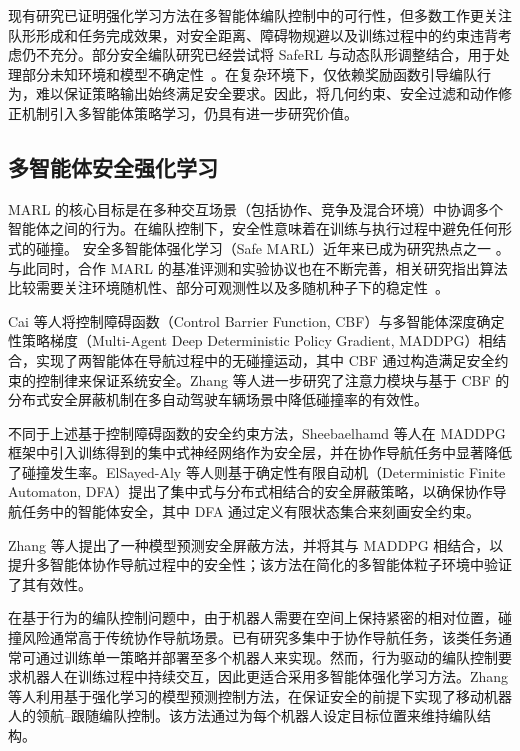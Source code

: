 现有研究已证明强化学习方法在多智能体编队控制中的可行性，但多数工作更关注队形形成和任务完成效果，对安全距离、障碍物规避以及训练过程中的约束违背考虑仍不充分。部分安全编队研究已经尝试将 SafeRL 与动态队形调整结合，用于处理部分未知环境和模型不确定性~\cite{golmisheh2023distributed_safe_formation}。在复杂环境下，仅依赖奖励函数引导编队行为，难以保证策略输出始终满足安全要求。因此，将几何约束、安全过滤和动作修正机制引入多智能体策略学习，仍具有进一步研究价值。

\subsection{多智能体安全强化学习}
MARL 的核心目标是在多种交互场景（包括协作、竞争及混合环境）中协调多个智能体之间的行为。在编队控制下，安全性意味着在训练与执行过程中避免任何形式的碰撞。
安全多智能体强化学习（Safe MARL）近年来已成为研究热点之一 \cite{gu2023safe,garg2024learning,li2025coordinating}。与此同时，合作 MARL 的基准评测和实验协议也在不断完善，相关研究指出算法比较需要关注环境随机性、部分可观测性以及多随机种子下的稳定性~\cite{papoudakis2021benchmarking_marl,gorsane2022standardised_marl_eval,ellis2023smacv2}。

Cai 等人\cite{cai2021safe}将控制障碍函数（Control Barrier Function, CBF）与多智能体深度确定性策略梯度（Multi-Agent Deep Deterministic Policy Gradient, MADDPG）\cite{lowe2017multi}相结合，实现了两智能体在导航过程中的无碰撞运动，其中 CBF 通过构造满足安全约束的控制律来保证系统安全。Zhang 等人\cite{zhang2023spatial}进一步研究了注意力模块与基于 CBF 的分布式安全屏蔽机制在多自动驾驶车辆场景中降低碰撞率的有效性。

不同于上述基于控制障碍函数的安全约束方法，Sheebaelhamd 等人\cite{sheebaelhamd2021safe}在 MADDPG 框架中引入训练得到的集中式神经网络作为安全层，并在协作导航任务中显著降低了碰撞发生率。ElSayed-Aly 等人\cite{elsayed2021safe}则基于确定性有限自动机（Deterministic Finite Automaton, DFA）提出了集中式与分布式相结合的安全屏蔽策略，以确保协作导航任务中的智能体安全，其中 DFA 通过定义有限状态集合来刻画安全约束。

Zhang 等人\cite{zhang2019mamps}提出了一种模型预测安全屏蔽方法，并将其与 MADDPG 相结合，以提升多智能体协作导航过程中的安全性；该方法在简化的多智能体粒子环境\cite{mordatch2018emergence}中验证了其有效性。

在基于行为的编队控制问题中，由于机器人需要在空间上保持紧密的相对位置，碰撞风险通常高于传统协作导航场景。已有研究多集中于协作导航任务，该类任务通常可通过训练单一策略并部署至多个机器人来实现\cite{everett2021collision,brito2021go,vinod2022safe}。然而，行为驱动的编队控制要求机器人在训练过程中持续交互，因此更适合采用多智能体强化学习方法。Zhang 等人\cite{zhang2022barrier}利用基于强化学习的模型预测控制方法，在保证安全的前提下实现了移动机器人的领航--跟随编队控制。该方法通过为每个机器人设定目标位置来维持编队结构。

